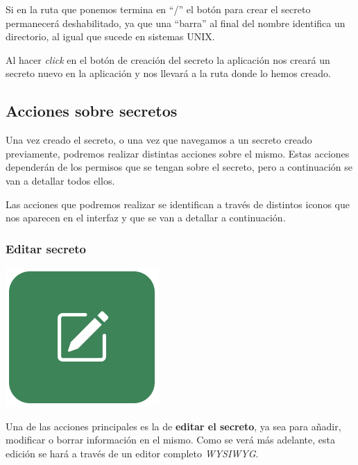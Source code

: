 \documentclass{\ClassPath/viu-tfm-template}
\begin{document}
Si en la ruta que ponemos termina en “/” el botón para crear el secreto permanecerá deshabilitado, ya que una “barra” al final del nombre identifica un directorio, al igual que sucede en sistemas UNIX.

Al hacer \textit{click} en el botón de creación del secreto la aplicación nos creará un secreto nuevo en la aplicación y nos llevará a la ruta donde lo hemos creado.

\subsection{Acciones sobre secretos}

Una vez creado el secreto, o una vez que navegamos a un secreto creado previamente, podremos realizar distintas acciones sobre el mismo. Estas acciones dependerán de los permisos que se tengan sobre el secreto, pero a continuación se van a detallar todos ellos.

Las acciones que podremos realizar se identifican a través de  distintos iconos que nos aparecen en el interfaz y que se van a detallar a continuación.


\subsubsection*{Editar secreto}
{
\begin{minipage}{0.1\linewidth}
    \includegraphics[width=\linewidth]{img/edit.png}
\end{minipage}
\hspace{0.5cm}
\begin{minipage}{0.9\linewidth}
    Una de las acciones principales es la de \textbf{editar el secreto}, ya sea para añadir, modificar o borrar información en el mismo. Como se verá más adelante, esta edición se hará a través de un editor completo \textit{WYSIWYG}.
\end{minipage}
}
\end{document}
